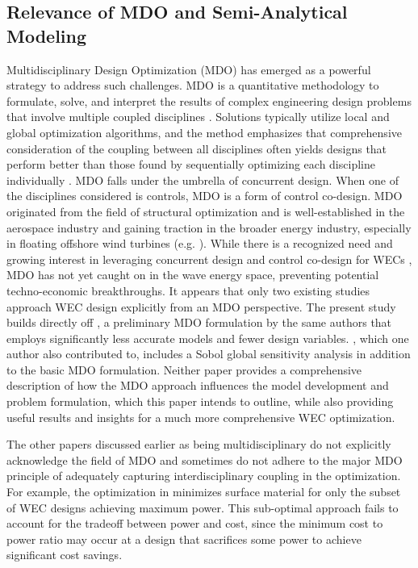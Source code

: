 \subsection{Relevance of MDO and Semi-Analytical Modeling}
Multidisciplinary Design Optimization (MDO) has emerged as a powerful strategy to address such challenges.
MDO is a quantitative methodology to formulate, solve, and interpret the results of complex engineering design problems that involve multiple coupled disciplines \cite{agteMDOAssessmentDirection2009}.
Solutions typically utilize local and global optimization algorithms, and the method emphasizes that comprehensive consideration of the coupling between all disciplines often yields designs that perform better than those found by sequentially optimizing each discipline individually \cite{martinsMultidisciplinaryDesignOptimization2013}.
MDO falls under the umbrella of concurrent design.
When one of the disciplines considered is controls, MDO is a form of control co-design.
MDO originated from the field of structural optimization and is well-established in the aerospace industry and gaining traction in the broader energy industry, especially in floating offshore wind turbines (e.g. \cite{abbas_control_2024,jasa_effectively_2022,patryniak_multidisciplinary_2022}).
While there is a recognized need and growing interest in leveraging concurrent design and control co-design for WECs \cite{mi_multi-scale_2025,ringwood_empowering_2023}, MDO has not yet caught on in the wave energy space, preventing potential techno-economic breakthroughs.
It appears that only two existing studies \cite{mccabe_multidisciplinary_2022,khanal_multi-objective_2024} approach WEC design explicitly from an MDO perspective.
The present study builds directly off \cite{mccabe_multidisciplinary_2022}, a preliminary MDO formulation by the same authors that employs significantly less accurate models and fewer design variables.
\cite{khanal_multi-objective_2024}, which one author also contributed to, includes a Sobol global sensitivity analysis in addition to the basic MDO formulation.
Neither paper provides a comprehensive description of how the MDO approach influences the model development and problem formulation, which this paper intends to outline, while also providing useful results and insights for a much more comprehensive WEC optimization. 

The other papers discussed earlier as being multidisciplinary do not explicitly acknowledge the field of MDO and sometimes do not adhere to the major MDO principle of adequately capturing interdisciplinary coupling in the optimization.
For example, the optimization in \cite{edwards_optimisation_2022} minimizes surface material for only the subset of WEC designs achieving maximum power.
This sub-optimal approach fails to account for the tradeoff between power and cost, since the minimum cost to power ratio may occur at a design that sacrifices some power to achieve significant cost savings.

